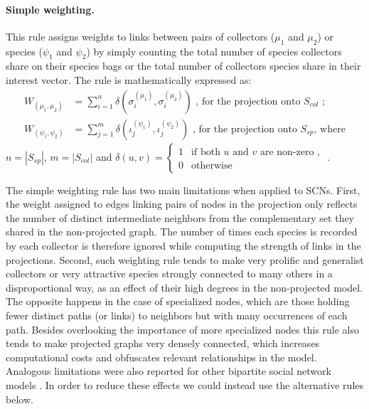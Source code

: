 \paragraph*{Simple weighting.}
This rule assigns weights to links between pairs of collectors ($\mu_1$ and $\mu_2$) or species ($\psi_1$ and $\psi_2$) by simply counting the total number of species collectors share on their species bags or the total number of collectors species share in their interest vector. The rule is mathematically expressed as:
\begin{equation} \label{eq:simple_weighting}
\begin{split}
W_{(\mu_1, \mu_2)} &= \sum_{i=1}^{n} \delta(\sigma_i^{(\mu_1)}, \sigma_i^{(\mu_2)})\mbox{ , for the projection onto }S_{col}\mbox{ ;}\\
W_{(\psi_1, \psi_2)} &= \sum_{j=1}^{m} \delta(\iota_j^{(\psi_1)}, \iota_j^{(\psi_2)})
\mbox{ , for the projection onto }S_{sp}\mbox{, where}
\end{split}
\end{equation}
$n = |S_{sp}|$, $m = |S_{col}|$ and 
$\delta(u,v) = 
\begin{cases}
1 & \mbox{if both } u \mbox{ and } v \mbox{ are non-zero ,}\\
0 & \mbox{otherwise}
\end{cases}
$ .

The simple weighting rule has two main limitations when applied to SCNs.
First, the weight assigned to edges linking pairs of nodes in the projection only reflects the number of distinct intermediate neighbors from the complementary set they shared in the non-projected graph. The number of times each species is recorded by each collector is therefore ignored while computing the strength of links in the projections.
Second, such weighting rule tends to make very prolific and generalist collectors or very attractive species strongly connected to many others in a disproportional way, as an effect of their high degrees in the non-projected model. The opposite happens in the case of specialized nodes, which are those holding fewer distinct paths (or links) to neighbors but with many occurrences of each path. Besides overlooking the importance of more specialized nodes this rule also tends to make projected graphs very densely connected, which increases computational costs and obfuscates relevant relationships in the model. Analogous limitations were also reported for other bipartite social network models \cite{Lambiotte2005}.
In order to reduce these effects we could instead use the alternative rules below.

